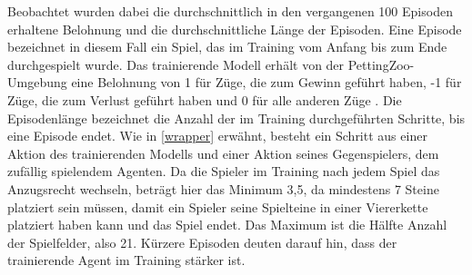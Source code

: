 Beobachtet wurden dabei die durchschnittlich in den vergangenen 100 Episoden erhaltene Belohnung und die durchschnittliche Länge der Episoden. Eine Episode bezeichnet in diesem Fall ein Spiel, das im Training vom Anfang bis zum Ende durchgespielt wurde. Das trainierende Modell erhält von der PettingZoo-Umgebung eine Belohnung von 1 für Züge, die zum Gewinn geführt haben, -1 für Züge, die zum Verlust geführt haben und 0 für alle anderen Züge \cite{Farama.2025}. Die Episodenlänge bezeichnet die Anzahl der im Training durchgeführten Schritte, bis eine Episode endet. Wie in \ref{wrapper} erwähnt, besteht ein Schritt aus einer Aktion des trainierenden Modells und einer Aktion seines Gegenspielers, dem zufällig spielendem Agenten. Da die Spieler im Training nach jedem Spiel das Anzugsrecht wechseln, beträgt hier das Minimum 3,5, da mindestens 7 Steine platziert sein müssen, damit ein Spieler seine Spielteine in einer Viererkette platziert haben kann und das Spiel endet. Das Maximum ist die Hälfte Anzahl der Spielfelder, also 21. Kürzere Episoden deuten darauf hin, dass der trainierende Agent im Training stärker ist.

